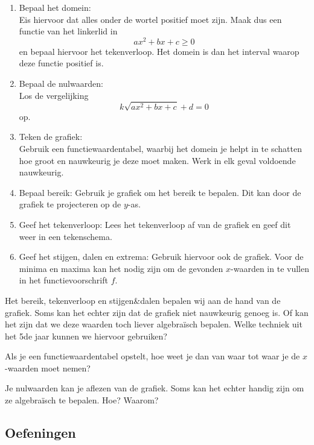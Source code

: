 \documentclass[12pt,twoside]{article}
\begin{document}
\begin{enumerate}
\item Bepaal het domein:\\
  Eis hiervoor dat alles onder de wortel positief moet zijn. Maak dus een functie van het linkerlid in
  $$ ax^2 + bx + c \geq 0$$
  en bepaal hiervoor het tekenverloop. Het domein is dan het interval waarop deze functie positief is.
\item Bepaal de nulwaarden:\\
  Los de vergelijking
  $$ k\sqrt{ax^2+bx+c} + d = 0$$
  op.
\item Teken de grafiek:\\
  Gebruik een functiewaardentabel, waarbij het domein je helpt in te schatten hoe groot en nauwkeurig je deze moet maken. Werk in elk geval voldoende nauwkeurig.
\item Bepaal bereik:
  Gebruik je grafiek om het bereik te bepalen. Dit kan door de grafiek te projecteren op de $y$-as.
\item Geef het tekenverloop:
  Lees het tekenverloop af van de grafiek en geef dit weer in een tekenschema.
\item Geef het stijgen, dalen en extrema:
  Gebruik hiervoor ook de grafiek. Voor de minima en maxima kan het nodig zijn om de gevonden $x$-waarden in te vullen in het functievoorschrift $f$.
\end{enumerate}

\begin{oefening}
Het bereik, tekenverloop en stijgen\&dalen bepalen wij aan de hand van de grafiek. Soms kan het echter zijn dat de grafiek niet nauwkeurig genoeg is. Of kan het zijn dat we deze waarden toch liever algebraïsch bepalen. Welke techniek uit het 5de jaar kunnen we hiervoor gebruiken?
\end{oefening}

\begin{oefening}
Als je een functiewaardentabel opstelt, hoe weet je dan van waar tot waar je de $x$-waarden moet nemen?
\end{oefening}

\begin{oefening}
Je nulwaarden kan je aflezen van de grafiek. Soms kan het echter handig zijn om ze algebraïsch te bepalen. Hoe? Waarom?
\end{oefening}

\needspace{4cm}
\subsection{Oefeningen}
\end{document}
